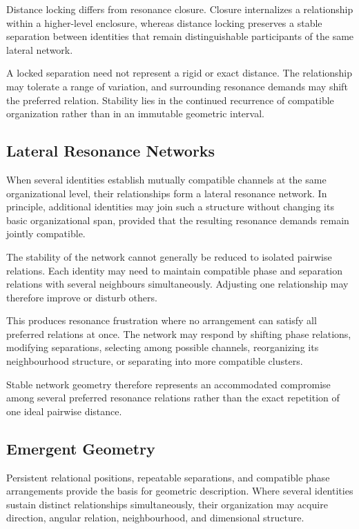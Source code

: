\documentclass[11pt,a4paper]{article}
\begin{document}
Distance locking differs from resonance closure. Closure internalizes a relationship within a higher-level enclosure, whereas distance locking preserves a stable separation between identities that remain distinguishable participants of the same lateral network.

A locked separation need not represent a rigid or exact distance. The relationship may tolerate a range of variation, and surrounding resonance demands may shift the preferred relation. Stability lies in the continued recurrence of compatible organization rather than in an immutable geometric interval.

\subsection{Lateral Resonance Networks}

When several identities establish mutually compatible channels at the same organizational level, their relationships form a lateral resonance network. In principle, additional identities may join such a structure without changing its basic organizational span, provided that the resulting resonance demands remain jointly compatible.

The stability of the network cannot generally be reduced to isolated pairwise relations. Each identity may need to maintain compatible phase and separation relations with several neighbours simultaneously. Adjusting one relationship may therefore improve or disturb others.

This produces resonance frustration where no arrangement can satisfy all preferred relations at once. The network may respond by shifting phase relations, modifying separations, selecting among possible channels, reorganizing its neighbourhood structure, or separating into more compatible clusters.

Stable network geometry therefore represents an accommodated compromise among several preferred resonance relations rather than the exact repetition of one ideal pairwise distance.


\subsection{Emergent Geometry}

Persistent relational positions, repeatable separations, and compatible phase arrangements provide the basis for geometric description. Where several identities sustain distinct relationships simultaneously, their organization may acquire direction, angular relation, neighbourhood, and dimensional structure.
\end{document}
